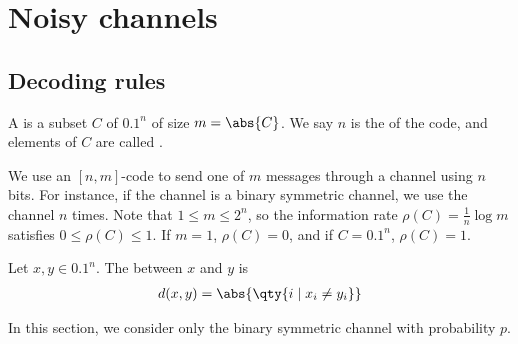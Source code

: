 \section{Noisy channels}

\subsection{Decoding rules}
\begin{definition}
    A  is a subset $C$ of $\qty{0,1}^n$ of size $m = \abs{C}$.
    We say $n$ is the  of the code, and elements of $C$ are called .
\end{definition}

We use an $[n,m]$-code to send one of $m$ messages through a channel using $n$ bits.
For instance, if the channel is a binary symmetric channel, we use the channel $n$ times.
Note that $1 \leq m \leq 2^n$, so the information rate $\rho(C) = \frac{1}{n} \log m$ satisfies $0 \leq \rho(C) \leq 1$.
If $m = 1$, $\rho(C) = 0$, and if $C = \qty{0,1}^n$, $\rho(C) = 1$.

\begin{definition}
    Let $x, y \in \qty{0,1}^n$.
    The  between $x$ and $y$ is
    \begin{align*}
        d(x,y) = \abs{\qty{i \mid x_i \neq y_i}}
    \end{align*}
\end{definition}

In this section, we consider only the binary symmetric channel with probability $p$.

